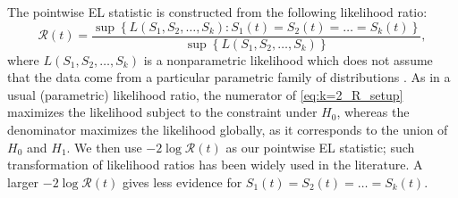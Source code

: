 The pointwise EL statistic is constructed from the following likelihood ratio:
\begin{equation} \label{eq:k=2_R_setup}
\mathcal{R}\left(t\right)= \frac { \sup{ \left \{ L\left(S_1,S_2,\ldots,S_k\right)\colon S_1\left(t\right)=S_2\left(t\right)=\ldots=S_k\left(t\right) \right \} } } {\sup{ \left \{ L\left(S_1,S_2,\ldots,S_k\right) \right \} } },
\end{equation} 
where $L(S_1,S_2, \ldots, S_k)$ is a nonparametric likelihood which does not assume that the data come from a particular parametric family of distributions \citep[][]{TG:1975}.
As in a usual (parametric) likelihood ratio, the numerator of \eqref{eq:k=2_R_setup} maximizes the likelihood subject to the constraint under $H_0$, whereas the denominator maximizes the likelihood globally, as it corresponds to the union of $H_0$ and $H_1$. %
We then use $-2 \log \mathcal{R}(t)$ as our pointwise EL statistic; such transformation of likelihood ratios has been widely used in the literature. %
A larger $-2 \log \mathcal{R}(t)$ gives less evidence for $S_1(t)=S_2(t)=\ldots=S_k(t)$.


